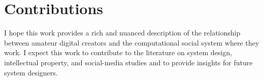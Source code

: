 \chapter{Contributions}

I hope this work provides a rich and nuanced description of the relationship between amateur digital creators and the computational social system where they work. I expect this work to contribute to the literature on system design, intellectual property, and social-media studies and to provide insights for future system designers.
